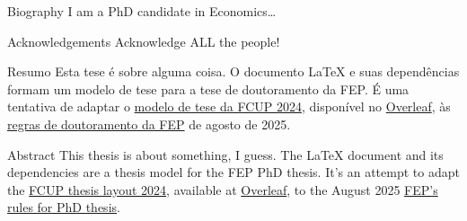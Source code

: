 
\begin{envprecontent}{Biography}
I am a PhD candidate in Economics\dots
\end{envprecontent}

\begin{envprecontent}{Acknowledgements}
Acknowledge ALL the people!
\end{envprecontent}

\begin{envprecontent}[portuguese]{Resumo}
Esta tese é sobre alguma coisa. 
O documento LaTeX e suas dependências formam um modelo de tese para a tese de doutoramento da FEP. É uma tentativa de adaptar o
\href{https://www.overleaf.com/latex/templates/fcup-thesis-layout-2024/gpbvtwzckzgm}{modelo de tese da FCUP 2024},
disponível no \href{https://www.overleaf.com/}{Overleaf},
às \href{https://sigarra.up.pt/fep/pt/conteudos_geral.ver?pct_pag_id=1009493\&pct_parametros=pv_unidade=7\&pct_grupo=28581\#28581}{regras de doutoramento da FEP} de agosto de 2025.
\end{envprecontent}

\begin{envprecontent}{Abstract}
This thesis is about something, I guess. 
The LaTeX document and its dependencies are a thesis model for the FEP PhD thesis. It's an attempt to adapt the 
\href{https://www.overleaf.com/latex/templates/fcup-thesis-layout-2024/gpbvtwzckzgm}{FCUP thesis layout 2024}, 
available at \href{https://www.overleaf.com/}{Overleaf}, 
to the August 2025 \href{https://sigarra.up.pt/fep/pt/conteudos_geral.ver?pct_pag_id=1009493\&pct_parametros=pv_unidade=7\&pct_grupo=28581\#28581}{FEP's rules for PhD thesis}.
\end{envprecontent}

